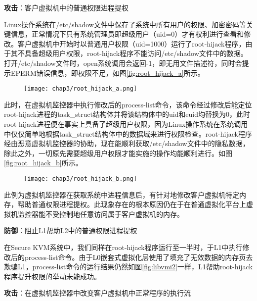 \noindent
\textbf{攻击\uppercase\expandafter{}}：客户虚拟机中的普通权限进程提权

Linux操作系统在/etc/shadow文件中保存了系统中所有用户的权限、加密密码等关键信息，正常情况下只有系统管理员即超级用户（uid=0）才有权利进行查看和修改。客户虚拟机中开始时以普通用户权限（uid=1000）运行了root-hijack程序，由于其不具备超级用户权限，root-hijack程序不能访问/etc/shadow文件中的数据。打开/etc/shadow文件时，open系统调用会返回-1，即无用文件描述符，同时会提示EPERM错误信息，即权限不足，如图\ref{fig:root_hijack_a}所示。

\begin{figure}[!htbp]
  \centering
  \texttt{[image: chap3/root\_hijack\_a.png]}
\end{figure}

此时，在虚拟机监控器中执行修改后的process-list命令，该命令经过修改后能定位root-hijack进程的task\_struct结构体并将该结构体中的uid和euid均替换为0，此时root-hijack进程便在事实上具备了超级用户权限，因为Linux操作系统在系统调用中仅仅简单地根据task\_struct结构体中的数据域来进行权限检查。root-hijack程序经由恶意虚拟机监控器的协助，现在能顺利获取/etc/shadow文件中的隐私数据，除此之外，一切原先需要超级用户权限才能实施的操作均能顺利进行。如图\ref{fig:root_hijack_b}所示。

\begin{figure}[!htbp]
  \centering
  \texttt{[image: chap3/root\_hijack\_b.png]}
\end{figure}

此例为虚拟机监控器在获取系统中进程信息后，有针对地修改客户虚拟机特定内存，帮助普通权限进程提权。此现象存在的根本原因仍在于在普通虚拟化平台上虚拟机监控器能不受控制地任意访问属于客户虚拟机的内存。

\noindent
\textbf{防御\uppercase\expandafter{}}：阻止L1帮助L2中的普通权限进程提权

在Secure KVM系统中，我们同样在root-hijack程序运行至一半时，于L1中执行修改后的process-list命令。由于L0嵌套式虚拟化层使用了填充了无效数据的内存页去欺骗L1，process-list命令的运行结果仍然如图\ref{fig:libvmi2}一样，L1帮助root-hijack程序提升权限的举动未能成功。

\noindent
\textbf{攻击\uppercase\expandafter{}}：在虚拟机监控器中改变客户虚拟机中正常程序的执行流

